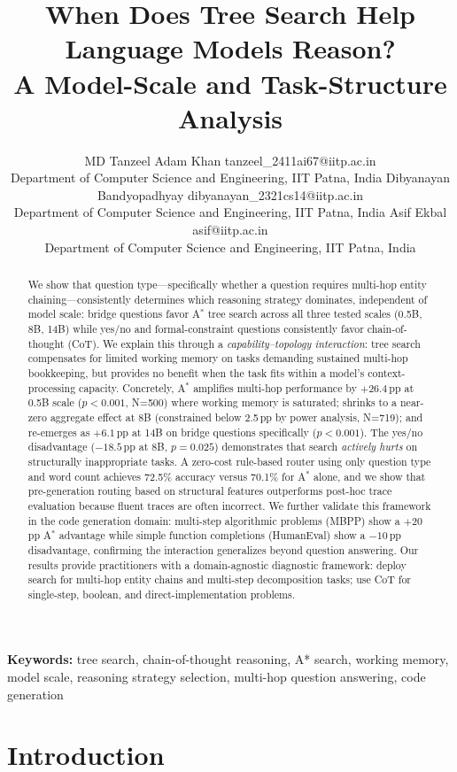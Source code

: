 \documentclass{article}
\title{When Does Tree Search Help Language Models Reason?\\
A Model-Scale and Task-Structure Analysis}
\author{%
  \name MD Tanzeel Adam Khan \email tanzeel\_2411ai67@iitp.ac.in \\
  \addr Department of Computer Science and Engineering, IIT Patna, India
  \AND
  \name Dibyanayan Bandyopadhyay \email dibyanayan\_2321cs14@iitp.ac.in \\
  \addr Department of Computer Science and Engineering, IIT Patna, India
  \AND
  \name Asif Ekbal \email asif@iitp.ac.in \\
  \addr Department of Computer Science and Engineering, IIT Patna, India
}
\newcommand{\astar}{A$^*$\xspace}
\begin{document}
\maketitle

\begin{abstract}
We show that question type---specifically whether a question requires multi-hop entity chaining---consistently determines which reasoning strategy dominates, independent of model scale: bridge questions favor \astar tree search across all three tested scales (0.5B, 8B, 14B) while yes/no and formal-constraint questions consistently favor chain-of-thought (CoT). We explain this through a \emph{capability--topology interaction}: tree search compensates for limited working memory on tasks demanding sustained multi-hop bookkeeping, but provides no benefit when the task fits within a model's context-processing capacity. Concretely, \astar amplifies multi-hop performance by $+26.4$\,pp at 0.5B scale ($p<0.001$, N=500) where working memory is saturated; shrinks to a near-zero aggregate effect at 8B (constrained below 2.5\,pp by power analysis, N=719); and re-emerges as $+6.1$\,pp at 14B on bridge questions specifically ($p<0.001$). The yes/no disadvantage ($-18.5$\,pp at 8B, $p=0.025$) demonstrates that search \emph{actively hurts} on structurally inappropriate tasks. A zero-cost rule-based router using only question type and word count achieves 72.5\% accuracy versus 70.1\% for \astar alone, and we show that pre-generation routing based on structural features outperforms post-hoc trace evaluation because fluent traces are often incorrect. We further validate this framework in the code generation domain: multi-step algorithmic problems (MBPP) show a $+20$\,pp \astar advantage while simple function completions (HumanEval) show a $-10$\,pp disadvantage, confirming the interaction generalizes beyond question answering. Our results provide practitioners with a domain-agnostic diagnostic framework: deploy search for multi-hop entity chains and multi-step decomposition tasks; use CoT for single-step, boolean, and direct-implementation problems.
\end{abstract}

\textbf{Keywords:} tree search, chain-of-thought reasoning, A* search, working memory, model scale, reasoning strategy selection, multi-hop question answering, code generation

\section{Introduction}
\label{sec:intro}
\end{document}
